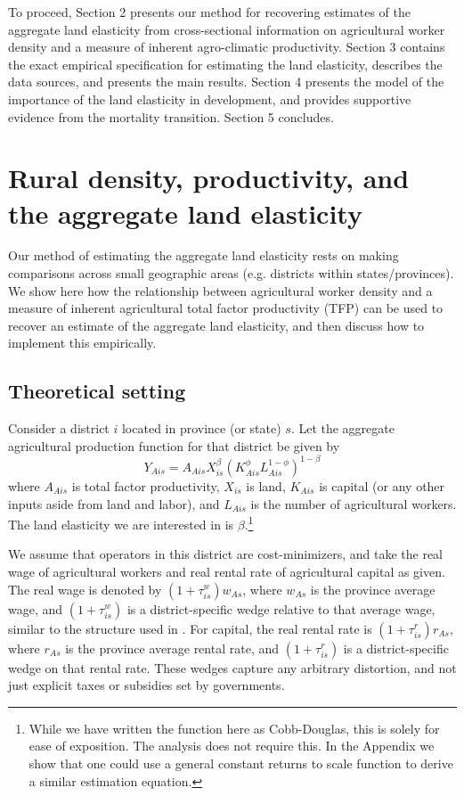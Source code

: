 \documentclass[11pt]{article}
\begin{document}
To proceed, Section 2 presents our method for recovering estimates of the aggregate land elasticity from cross-sectional information on agricultural worker density and a measure of inherent agro-climatic productivity. Section 3 contains the exact empirical specification for estimating the land elasticity, describes the data sources, and presents the main results. Section 4 presents the model of the importance of the land elasticity in development, and provides supportive evidence from the mortality transition. Section 5 concludes.

\section{Rural density, productivity, and the aggregate land elasticity}\label{SEC_agmodel}
Our method of estimating the aggregate land elasticity rests on making comparisons across small geographic areas (e.g. districts within states/provinces). We show here how the relationship between agricultural worker density and a measure of inherent agricultural total factor productivity (TFP) can be used to recover an estimate of the aggregate land elasticity, and then discuss how to implement this empirically.

\subsection{Theoretical setting}
Consider a district $i$ located in province (or state) $s$. Let the aggregate agricultural production function for that district be given by
\begin{equation}
Y_{Ais} = A_{Ais} X_{is}^{\beta} \left(K_{Ais}^{\phi}L_{Ais}^{1-\phi}\right)^{1-\beta} \label{EQ_production}
\end{equation}
where $A_{Ais}$ is total factor productivity, $X_{is}$ is land, $K_{Ais}$ is capital (or any other inputs aside from land and labor), and $L_{Ais}$ is the number of agricultural workers. The land elasticity we are interested in is $\beta$.\footnote{While we have written the function here as Cobb-Douglas, this is solely for ease of exposition. The analysis does not require this. In the Appendix we show that one could use a general constant returns to scale function to derive a similar estimation equation.}

We assume that operators in this district are cost-minimizers, and take the real wage of agricultural workers and real rental rate of agricultural capital as given. The real wage is denoted by $(1+\tau^w_{is})w_{As}$, where $w_{As}$ is the province average wage, and $(1+\tau^w_{is})$ is a district-specific wedge relative to that average wage, similar to the structure used in \cite{hsieh2009misallocation}. For capital, the real rental rate is $(1+\tau^r_{is})r_{As}$, where $r_{As}$ is the province average rental rate, and $(1+\tau^r_{is})$ is a district-specific wedge on that rental rate. These wedges capture any arbitrary distortion, and not just explicit taxes or subsidies set by governments.
\end{document}
